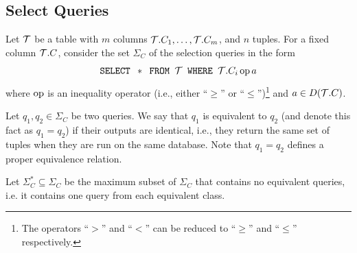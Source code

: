 \subsection{Select Queries}\label{sec:vcdimselqueries}
Let ${\cal T}$ be a table with $m$ columns ${\cal T}.C_1,\dotsc,{\cal T}.C_m$, and $n$
tuples. For a fixed column ${\cal T}.C$, consider the set $\Sigma_C$ of the
selection queries in the form 
\begin{equation}\label{eq:select}
\mbox{\texttt{SELECT }} *\mbox{\texttt{ FROM }} {\cal T} \mbox{\texttt{ WHERE }}
{\cal T}.C_i \operatorname{op} a \end{equation}
where $\operatorname{op}$ is an inequality operator (i.e., either ``$\ge$'' or
``$\le$'')\footnote{The operators
``$>$'' and ``$<$'' can be reduced to ``$\ge$'' and ``$\le$'' respectively.} and
$a\in D({\cal T}.C)$. 

Let $q_1,q_2\in\Sigma_C$ be two queries. We say that $q_1$ is equivalent to
$q_2$ (and denote this fact as $q_1=q_2$) if their outputs are identical, i.e.,
they return the same set of tuples when they are run on the same database. Note
that $q_1=q_2$ defines a proper equivalence relation. 

Let $\Sigma^*_C \subseteq \Sigma_C$ be the maximum subset of $\Sigma_C$ that
contains no equivalent queries, i.e. it contains one query from each equivalent
class.
%
%


